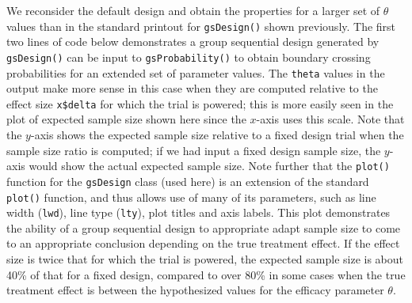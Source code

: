 We reconsider the default design and obtain the properties for a larger
set of $\theta$ values than in the standard printout for \texttt{gsDesign()} shown previously.
The first two lines of code below demonstrates a group sequential design generated by \texttt{gsDesign()} can be input to \texttt{gsProbability()} to obtain boundary crossing probabilities for an extended set of parameter values.
The \texttt{theta} values in the output make more sense in this case when they are computed relative to the effect size \texttt{x\$delta} for which the trial is powered; this is more easily seen in the plot of expected sample size shown here since the $x$-axis uses this scale. 
Note that the $y$-axis shows the expected sample size relative to a fixed design trial when the sample size ratio is computed; if we had input a fixed design sample size, the $y$-axis would show the actual expected sample size.
Note further that the \texttt{plot()} function for the \texttt{gsDesign} class (used here) is an extension of the standard \texttt{plot()} function, and thus allows use of many of its parameters, such as line width (\texttt{lwd}), line type (\texttt{lty}), plot titles and axis labels.
This plot demonstrates the ability of a group sequential design to appropriate adapt sample size to come to an appropriate conclusion depending on the true treatment effect. If the effect size is twice that for which the trial is powered, the expected sample size is about 40\% of that for a fixed design, compared to over 80\% in some cases when the true treatment effect is between the hypothesized values for the efficacy parameter $\theta$. 

\bigskip

